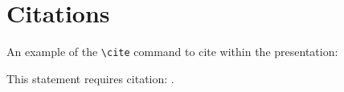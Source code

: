 \section{Citations}
\label{section3}
\renewcommand*{\runninghead}{\nameref{section3}}

An example of the \texttt{\textbackslash cite} command to cite within the presentation:

This statement requires citation: \cite{deimeke2018}.

\clearpage